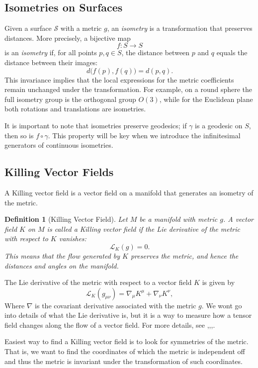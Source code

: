 \documentclass[12pt]{article}
\newtheorem{definition}{Definition}[section]
\begin{document}
\subsection{Isometries on Surfaces}
Given a surface $\mathcal{S}$ with a metric $g$, an \emph{isometry} is a transformation that preserves distances. More precisely, a bijective map
\[
f: S \to S
\]
is an \emph{isometry} if, for all points $p,q\in S$, the distance between $p$ and $q$ equals the distance between their images:
\[
d\big(f(p),f(q)\big)=d(p,q).
\]
This invariance implies that the local expressions for the metric coefficients remain unchanged under the transformation. 
For example, on a round sphere the full isometry group is the orthogonal group $O(3)$, while for the Euclidean plane both rotations and translations are isometries.

It is important to note that isometries preserve geodesics; if $\gamma$ is a geodesic on $S$, then so is $f\circ\gamma$. 
This property will be key when we introduce the infinitesimal generators of continuous isometries.

\begingroup
\color{blue}

\subsection{Killing Vector Fields}
A Killing vector field is a vector field on a manifold that generates an isometry of the metric.

\begin{definition}[Killing Vector Field]
	Let \(M\) be a manifold with metric \(g\). A vector field \(K\) on \(M\) is called a \emph{Killing vector field} if the Lie derivative of the metric with respect to \(K\) vanishes:
	\[
		\mathcal{L}_{K} (g) = 0.
	\]
	This means that the flow generated by \(K\) preserves the metric, and hence the distances and angles on the manifold.
\end{definition}
The Lie derivative of the metric with respect to a vector field \(K\) is given by
\[
	\mathcal{L}_{K} (g_{\mu\nu}) = \nabla_{\mu} K^{\mu} + \nabla_{\nu} K^{\nu},
\]
Where \(\nabla\) is the covariant derivative associated with the metric \(g\).
We wont go into details of what the Lie derivative is, but it is a way to measure how a tensor field changes along the flow of a vector field.
For more details, see \cite{oprea2007differential},\cite{note32020covariant},\cite{atkins2018solving},\cite{carrol2019spacetime}.


Easiest way to find a Killing vector field is to look for symmetries of the metric.
That is, we want to find the coordinates of which the metric is independent off and thus the metric is invariant under the transformation of such coordinates.
\end{document}
